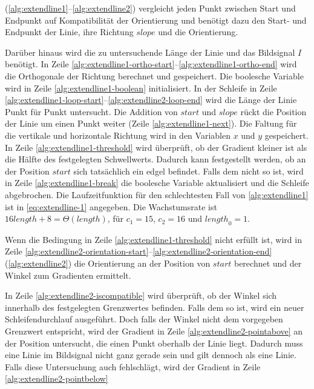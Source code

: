  (\autoref{alg:extendline1}--\autoref{alg:extendline2}) vergleicht jeden Punkt zwischen Start und
 Endpunkt auf Kompatibilität der Orientierung und benötigt dazu den Start- und Endpunkt der Linie, ihre Richtung
 $\mathit{slope}$ und die Orientierung.

Darüber hinaus wird die zu untersuchende Länge der Linie und das Bildsignal $I$ benötigt. In Zeile
 \ref{alg:extendline1-ortho-start}--\ref{alg:extendline1-ortho-end} wird die Orthogonale der Richtung berechnet und
 gespeichert. Die boolesche Variable wird in Zeile \ref{alg:extendline1-boolean} initialisiert. In der Schleife in Zeile
 \ref{alg:extendline1-loop-start}--\ref{alg:extendline2-loop-end} wird die Länge der Linie Punkt für Punkt untersucht.
 Die Addition von $\mathit{start}$ und $\mathit{slope}$ rückt die Position der Linie um einen Punkt weiter (Zeile
 \ref{alg:extendline1-next}). Die Faltung für die vertikale und horizontale Richtung wird in den Variablen $x$ und $y$
 gespeichert. In Zeile \ref{alg:extendline1-threshold} wird überprüft, ob der Gradient kleiner ist als die Hälfte des
 festgelegten Schwellwerts. Dadurch kann festgestellt werden, ob an der Position $\mathit{start}$ sich tatsächlich ein
 \gls{edgel} befindet. Falls dem nicht so ist, wird in Zeile \ref{alg:extendline1-break} die boolesche Variable
 aktualisiert und die Schleife abgebrochen. Die Laufzeitfunktion für den schlechtesten Fall von
 \autoref{alg:extendline1} ist in \autoref{eq:extendline-1} angegeben. Die Wachstumsrate ist
 $16\mathit{length} + 8 = \Theta(length)$, für $c_{1} = 15$, $c_{2} = 16$ und $\mathit{length}_{0} = 1$.

Wenn die Bedingung in Zeile \ref{alg:extendline1-threshold} nicht erfüllt ist, wird in Zeile
 \ref{alg:extendline2-orientation-start}--\ref{alg:extendline2-orientation-end} (\autoref{alg:extendline2}) die
 Orientierung an der Position von $\mathit{start}$ berechnet und der Winkel zum Gradienten ermittelt.

In Zeile \ref{alg:extendline2-iscompatible} wird überprüft, ob der Winkel sich innerhalb des festgelegten Grenzwertes
 befinden. Falls dem so ist, wird ein neuer Schleifendurchlauf ausgeführt. Doch falls der Winkel nicht dem vorgegeben
 Grenzwert entspricht, wird der Gradient in Zeile \ref{alg:extendline2-pointabove} an der Position untersucht, die
 einen Punkt oberhalb der Linie liegt. Dadurch muss eine Linie im Bildsignal nicht ganz gerade sein und gilt dennoch
 als eine Linie. Falls diese Untersuchung auch fehlschlägt, wird der Gradient in Zeile \ref{alg:extendline2-pointbelow}
